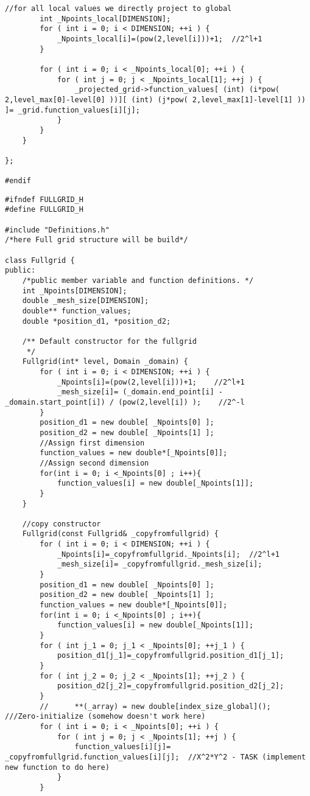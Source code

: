 \begin{lstlisting}[caption= Source code for adaptive combination technique, label=code:combi]
		//for all local values we directly project to global
		int _Npoints_local[DIMENSION];
		for ( int i = 0; i < DIMENSION; ++i ) {
			_Npoints_local[i]=(pow(2,level[i]))+1;	//2^l+1
		}

		for ( int i = 0; i < _Npoints_local[0]; ++i ) {
			for ( int j = 0; j < _Npoints_local[1]; ++j ) {
				_projected_grid->function_values[ (int) (i*pow( 2,level_max[0]-level[0] ))][ (int) (j*pow( 2,level_max[1]-level[1] )) ]= _grid.function_values[i][j];
			}
		}
	}

};

#endif
\end{lstlisting}

 \lstset{language=C++}
\begin{lstlisting}[caption= Source code for Full grid method, label=code:fullG]
#ifndef FULLGRID_H
#define FULLGRID_H

#include "Definitions.h"
/*here Full grid structure will be build*/

class Fullgrid {
public:
	/*public member variable and function definitions. */
	int _Npoints[DIMENSION];
	double _mesh_size[DIMENSION];
	double** function_values;
	double *position_d1, *position_d2;

	/** Default constructor for the fullgrid
	 */
	Fullgrid(int* level, Domain _domain) {
		for ( int i = 0; i < DIMENSION; ++i ) {
			_Npoints[i]=(pow(2,level[i]))+1;	//2^l+1
			_mesh_size[i]= (_domain.end_point[i] - _domain.start_point[i]) / (pow(2,level[i]) );	//2^-l
		}
		position_d1 = new double[ _Npoints[0] ];
		position_d2 = new double[ _Npoints[1] ];
		//Assign first dimension
		function_values = new double*[_Npoints[0]];
		//Assign second dimension
		for(int i = 0; i <_Npoints[0] ; i++){
			function_values[i] = new double[_Npoints[1]];
		}
	}

	//copy constructor
	Fullgrid(const Fullgrid& _copyfromfullgrid) {
		for ( int i = 0; i < DIMENSION; ++i ) {
			_Npoints[i]=_copyfromfullgrid._Npoints[i];	//2^l+1
			_mesh_size[i]= _copyfromfullgrid._mesh_size[i];
		}
		position_d1 = new double[ _Npoints[0] ];
		position_d2 = new double[ _Npoints[1] ];
		function_values = new double*[_Npoints[0]];
		for(int i = 0; i <_Npoints[0] ; i++){
			function_values[i] = new double[_Npoints[1]];
		}
		for ( int j_1 = 0; j_1 < _Npoints[0]; ++j_1 ) {
			position_d1[j_1]=_copyfromfullgrid.position_d1[j_1];
		}
		for ( int j_2 = 0; j_2 < _Npoints[1]; ++j_2 ) {
			position_d2[j_2]=_copyfromfullgrid.position_d2[j_2];
		}
		//		**(_array) = new double[index_size_global]();  ///Zero-initialize (somehow doesn't work here)
		for ( int i = 0; i < _Npoints[0]; ++i ) {
			for ( int j = 0; j < _Npoints[1]; ++j ) {
				function_values[i][j]= _copyfromfullgrid.function_values[i][j];  //X^2*Y^2 - TASK (implement new function to do here)
			}
		}


\end{lstlisting}
